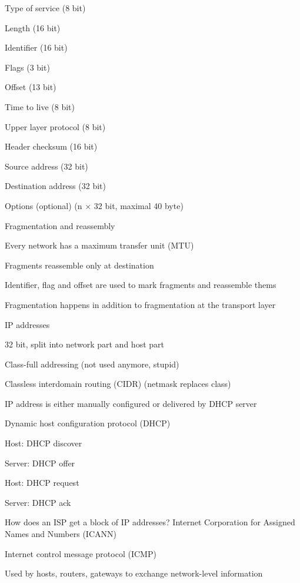 			\item Type of service (8 bit)
			\item Length (16 bit)
			\item Identifier (16 bit)
			\item Flags (3 bit)
			\item Offset (13 bit)
			\item Time to live (8 bit)
			\item Upper layer protocol (8 bit)
			\item Header checksum (16 bit)
			\item Source address (32 bit)
			\item Destination address (32 bit)
			\item Options (optional) (n $\times$ 32 bit, maximal 40 byte)
		\enumend
		\item Fragmentation and reassembly
		\enumstart
			\item Every network has a maximum transfer unit (MTU)
			\item Fragments reassemble only at destination
			\item Identifier, flag and offset are used to mark fragments and reassemble thems
			\item Fragmentation happens in addition to fragmentation at the transport layer
		\enumend
		\item IP addresses
		\enumstart
			\item 32 bit, split into network part and host part
			\item Class-full addressing (not used anymore, stupid)
			\item Classless interdomain routing (CIDR) (netmask replaces class)
			\item IP address is either manually configured or delivered by DHCP server
			\item Dynamic host configuration protocol (DHCP)
			\enumstart
				\item Host: DHCP discover
				\item Server: DHCP offer
				\item Host: DHCP request
				\item Server: DHCP ack
			\enumend
			\item How does an ISP get a block of IP addresses? Internet Corporation for Assigned Names and Numbers (ICANN)
		\enumend
	\enumend
	\item Internet control message protocol (ICMP)
	\enumstart
		\item Used by hosts, routers, gateways to exchange network-level information
